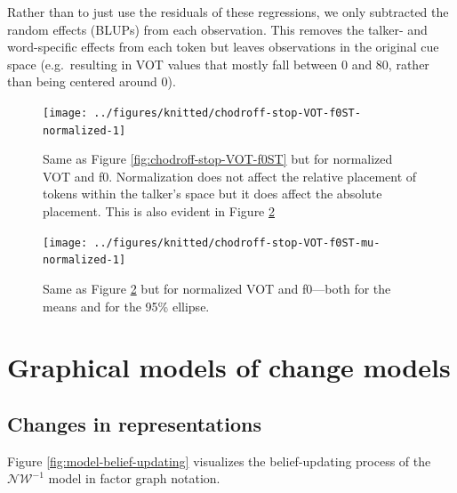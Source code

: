 \documentclass[
  11pt,
  english,
  man,floatsintext]{apa6}
\begin{document}
Rather than to just use the residuals of these regressions, we only subtracted the random effects (BLUPs) from each observation. This removes the talker- and word-specific effects from each token but leaves observations in the original cue space (e.g.~resulting in VOT values that mostly fall between 0 and 80, rather than being centered around 0).



\begin{figure}

{\centering \texttt{[image: ../figures/knitted/chodroff-stop-VOT-f0ST-normalized-1]} 

}

\caption{Same as Figure \ref{fig:chodroff-stop-VOT-f0ST} but for normalized VOT and f0. Normalization does not affect the relative placement of tokens within the talker's space but it does affect the absolute placement. This is also evident in Figure \ref{fig:chodroff-stop-VOT-f0ST-mu-normalized}}\label{fig:chodroff-stop-VOT-f0ST-normalized}
\end{figure}



\begin{figure}

{\centering \texttt{[image: ../figures/knitted/chodroff-stop-VOT-f0ST-mu-normalized-1]} 

}

\caption{Same as Figure \ref{fig:chodroff-stop-VOT-f0ST-mu-normalized} but for normalized VOT and f0---both for the means and for the 95\% ellipse.}\label{fig:chodroff-stop-VOT-f0ST-mu-normalized}
\end{figure}

\hypertarget{sec:SI-models}{%
\section{Graphical models of change models}\label{sec:SI-models}}

\hypertarget{sec:SI-models-changes-in-representations}{%
\subsection{Changes in representations}\label{sec:SI-models-changes-in-representations}}

Figure \ref{fig:model-belief-updating} visualizes the belief-updating process of the \(\mathcal{NW^{-1}}\) model in factor graph notation.
\end{document}
